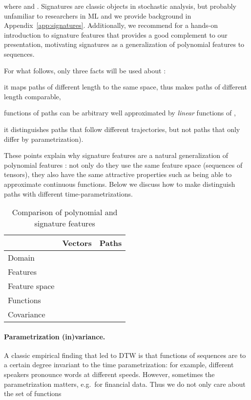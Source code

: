 \documentclass{article}
\begin{document}
where  and . 
Signatures are classic objects in stochastic analysis, but probably unfamiliar to researchers in ML and we provide background in Appendix~\ref{app:signatures}. Additionally, we recommend \cite{CK16} for a hands-on introduction to signature features that provides a good complement to our presentation, motivating signatures as a generalization of polynomial features to sequences.

For what follows, only three facts will be used about :
\begin{enumerate*}[label=(\arabic*)]
\item
  it maps paths of different length to the same space, thus makes paths of different length comparable,  
\item functions of paths can be arbitrary well approximated by \emph{linear} functions of ,
\item it distinguishes paths that follow different trajectories, but not paths that only differ by parametrization).
\end{enumerate*}
These points explain why signature features  are a natural generalization of polynomial features : not only do they use the same feature space (sequences of tensors), they also have the same attractive properties such as being able to approximate continuous functions.
Below we discuss how to make  distinguish paths with different time-parametrizations.

\begin{table}[t]
    \begin{center}
    \begin{small}
        \begin{tabular}{lrr}
        \toprule
        & Vectors & Paths \\
        \midrule
        Domain  &  & \\
        Features &  & \\
        Feature space &  & \\
        Functions &  & \\ 
        Covariance & & \\
        \bottomrule
        \end{tabular}
    \end{small}
    \end{center}
    \label{table:vectors_vs_paths}
    \caption{Comparison of polynomial and signature features}
\end{table}

\paragraph{Parametrization (in)variance.}
A classic empirical finding that led to DTW is that functions of sequences are to a certain degree invariant to the time parametrization: for example, different speakers pronounce words at different speeds. 
However, sometimes the parametrization matters, e.g.~for financial data.
Thus we do not only care about the set of functions 
\end{document}
